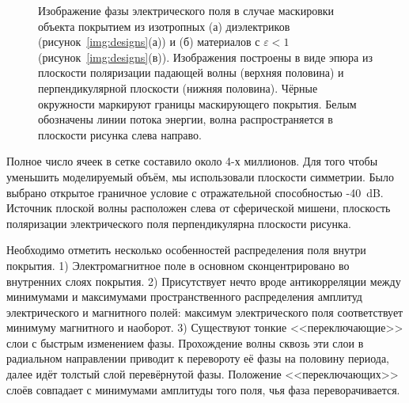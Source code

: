 \begin{figure}
  \begin{minipage}[ht]{0.495\linewidth}
  \end{minipage}
  \hfill
  \begin{minipage}[ht]{0.495\linewidth}
  \end{minipage}
  \caption{Изображение фазы электрического поля в случае маскировки
    объекта покрытием из изотропных (а) диэлектриков
    (рисунок~\ref{img:designs}(а)) и (б) материалов с
    ${\varepsilon <1}$ (рисунок~\ref{img:designs}(в)). Изображения
    построены в виде эпюра из плоскости поляризации падающей волны
    (верхняя половина) и перпендикулярной плоскости (нижняя
    половина). Чёрные окружности маркируют границы маскирующего
    покрытия. Белым обозначены линии потока энергии, волна
    распространяется в плоскости рисунка слева направо.}
  \label{img:field-phase}  
\end{figure}
Полное число ячеек в сетке составило около 4-х миллионов.  Для того
чтобы уменьшить моделируемый объём, мы использовали плоскости
симметрии.  Было выбрано открытое граничное условие с отражательной
способностью -40~dB.  Источник плоской волны расположен слева от
сферической мишени, плоскость поляризации электрического поля
перпендикулярна плоскости рисунка.

Необходимо отметить несколько особенностей распределения поля внутри
покрытия. 1) Электромагнитное поле в основном сконцентрировано во
внутренних слоях покрытия. 2) Присутствует нечто вроде антикорреляции
между минимумами и максимумами пространственного распределения
амплитуд электрического и магнитного полей: максимум электрического
поля соответствует минимуму магнитного и наоборот. 3) Существуют
тонкие <<переключающие>> слои с быстрым изменением фазы.  Прохождение
волны сквозь эти слои в радиальном направлении приводит к перевороту
её фазы на половину периода, далее идёт толстый слой перевёрнутой
фазы.  Положение <<переключающих>> слоёв совпадает с минимумами
амплитуды того поля, чья фаза переворачивается.

